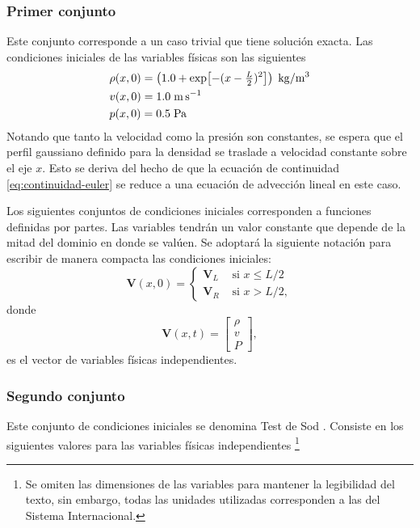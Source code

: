 \subsubsection{Primer conjunto}
\label{sec:gaussiana41}
Este conjunto corresponde a un caso trivial que tiene solución exacta. Las condiciones iniciales de las variables físicas son las siguientes
\begin{align}
	&\rho(x,0) =  \left(1.0+\exp[-(x-\tfrac{L}{2})^{2}]\right)\hspace{1mm}\unit{\kilogram\per\meter^{3}} \\
	&v(x,0) = 1.0 \hspace{1mm}\unit{\meter\per\second} \\
	&p(x,0) = 0.5 \hspace{1mm}\unit{\pascal}
\end{align}
Notando que tanto la velocidad como la presión son constantes, se espera que el perfil gaussiano definido para la densidad se traslade a velocidad constante sobre el eje $x$. Esto se deriva del hecho de que la ecuación de continuidad \eqref{eq:continuidad-euler} se reduce a una ecuación de advección lineal en este caso.

Los siguientes conjuntos de condiciones iniciales corresponden a funciones definidas por partes. Las variables tendrán un valor constante que depende de la mitad del dominio en donde se valúen. Se adoptará la siguiente notación para escribir de manera compacta las condiciones iniciales:
\begin{equation}
	\mathbf{V}(x,0) = 
	\begin{cases}
		\mathbf{V}_{L} & \text{ si } x \leq L/2\\
		\mathbf{V}_{R} & \text{ si } x > L/2,
	\end{cases}
\end{equation}
donde
\begin{equation}
\mathbf{V}(x,t) = 
	\begin{bmatrix}
		\rho \\
		v \\
		P
	\end{bmatrix},
\end{equation}
es el vector de variables físicas independientes.

\subsubsection{Segundo conjunto}
\label{sec:sod_con_entropy148}
Este conjunto de condiciones iniciales se denomina Test de Sod \cite{thesis-euler-godunov}. Consiste en los siguientes valores para las variables físicas independientes \footnote{Se omiten las dimensiones de las variables para mantener la legibilidad del texto, sin embargo, todas las unidades utilizadas corresponden a las del Sistema Internacional.}

